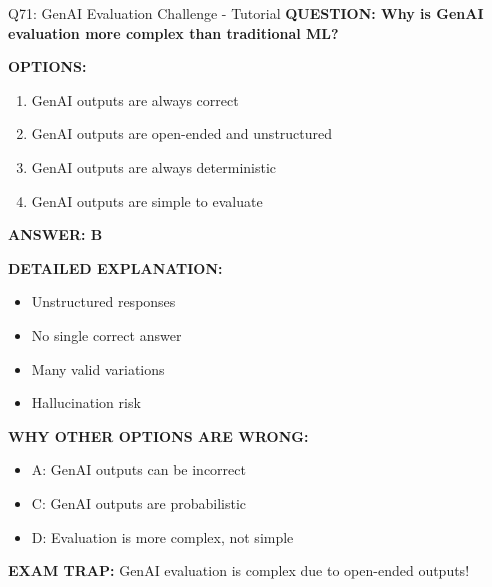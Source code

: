 \documentclass[8pt]{beamer}
\begin{document}
	\begin{frame}{Q71: GenAI Evaluation Challenge - Tutorial}
		\fontsize{6.5}{7.5}\selectfont
		\textbf{QUESTION: Why is GenAI evaluation more complex than traditional ML?}
		
		\vspace{0.1cm}
		\textbf{OPTIONS:}
		\begin{enumerate}
			\item GenAI outputs are always correct
			\item GenAI outputs are open-ended and unstructured
			\item GenAI outputs are always deterministic
			\item GenAI outputs are simple to evaluate
		\end{enumerate}
		
		\vspace{0.1cm}
		\textcolor{myblue}{\textbf{ANSWER: B}}
		
		\vspace{0.1cm}
		\textbf{DETAILED EXPLANATION:}
		\begin{itemize}
			\item Unstructured responses
			\item No single correct answer
			\item Many valid variations
			\item Hallucination risk
		\end{itemize}
		
		\vspace{0.1cm}
		\textcolor{myred}{\textbf{WHY OTHER OPTIONS ARE WRONG:}}
		\begin{itemize}
			\item \textcolor{myred}{A:} GenAI outputs can be incorrect
			\item \textcolor{myred}{C:} GenAI outputs are probabilistic
			\item \textcolor{myred}{D:} Evaluation is more complex, not simple
		\end{itemize}
		
		\textcolor{myred}{\textbf{EXAM TRAP:}} GenAI evaluation is \textcolor{myblue}{complex due to open-ended outputs}!
	\end{frame}
	
\end{document}
